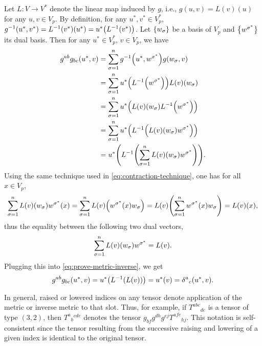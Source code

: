 \documentclass{note}
\numberwithin{equation}{chapter}
\begin{document}
Let $L\colon V\to V^*$ denote the linear map induced by $g$, i.e., $g(u, v) =
    L(v)(u)$ for any $u, v \in V_p$. By definition, for any $u^*, v^* \in V_p^*$,
$g^{-1}(u^*, v^*) = L^{-1}(v^*)(u^*) = u^*\prn{L^{-1}(v^*)}$. Let
$\set{w_\sigma}$ be a basis of $V_p$ and $\set{w^{\sigma^*}}$ its dual basis.
Then for any $u^* \in V_p^*$, $v \in V_p$, we have
\begin{align}
    g^{ab}g_{bc}(u^*, v)
     & = \sum_{\sigma=1}^n g^{-1}\prn{u^*, w^{\sigma^*}} g\prn{w_\sigma, v} \notag     \\
     & = \sum_{\sigma=1}^n u^*\prn{L^{-1}\prn{w^{\sigma^*}}} L(v)\prn{w_\sigma} \notag \\
     & = \sum_{\sigma=1}^n u^*\prn{L(v)\prn{w_\sigma}L^{-1}\prn{w^{\sigma^*}}} \notag  \\
     & = \sum_{\sigma=1}^n u^*\prn{L^{-1}\prn{L(v)\prn{w_\sigma}w^{\sigma^*}}} \notag  \\
     & = u^*\prn{L^{-1}\prn{\sum_{\sigma=1}^n L(v)\prn{w_\sigma}w^{\sigma^*}}}.
    \label{eq:prove-metric-inverse}
\end{align}
Using the same technique used in \eqref{eq:contraction-technique}, one has for
all $x \in V_p$,
\begin{equation*}
    \sum_{\sigma=1}^n L(v)\prn{w_\sigma}w^{\sigma^*}(x)
    = \sum_{\sigma=1}^n L(v)\prn{w^{\sigma^*}(x) w_\sigma}
    = L(v)\prn{\sum_{\sigma=1}^n w^{\sigma^*}(x) w_\sigma}
    = L(v)(x),
\end{equation*}
thus the equality between the following two dual vectors,
\begin{equation*}
    \sum_{\sigma=1}^n L(v)\prn{w_\sigma}w^{\sigma^*} = L(v).
\end{equation*}
Plugging this into \eqref{eq:prove-metric-inverse}, we get
\begin{equation*}
    g^{ab}g_{bc}(u^*, v) = u^*\prn{L^{-1}(L(v))} = u^*(v) =
    {\delta^a}_c\prn{u^*,v}.
\end{equation*}

\begin{quotebar}
    In general, raised or lowered indices on any tensor denote application of the
    metric or inverse metric to that slot. Thus, for example, if $T^{abc}{}_{de}$
    is a tensor of type $(3,2)$, then $T^a{}_b{}^{cde}$ denotes the tensor
    $g_{bf}g^{dh}g^{ej}T^{afc}{}_{hj}$. This notation is self-consistent since the
    tensor resulting from the successive raising and lowering of a given index is
    identical to the original tensor.
\end{quotebar}
\end{document}

